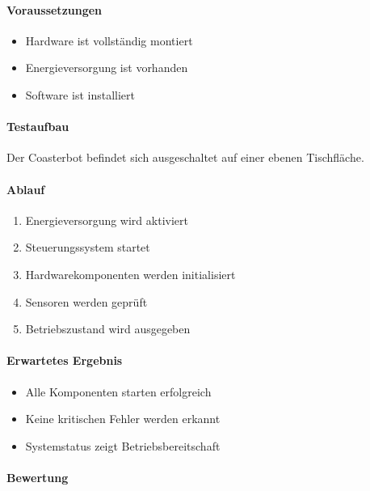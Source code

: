 \documentclass[
  a4paper,
  12pt,
  DIV=12,        %
  parskip=half,  %
  headings=small %
]{scrartcl}
\theoremstyle{definition}
\providecommand{\tightlist}{%
  \setlength{\itemsep}{0pt}\setlength{\parskip}{0pt}}
\theoremstyle{definition}
\begin{document}
\paragraph{Voraussetzungen}\label{voraussetzungen-23}

\begin{itemize}
\tightlist
\item
  Hardware ist vollständig montiert
\item
  Energieversorgung ist vorhanden
\item
  Software ist installiert
\end{itemize}

\paragraph{Testaufbau}\label{testaufbau}

Der Coasterbot befindet sich ausgeschaltet auf einer ebenen Tischfläche.

\paragraph{Ablauf}\label{ablauf-24}

\begin{enumerate}
\def\labelenumi{\arabic{enumi}.}
\tightlist
\item
  Energieversorgung wird aktiviert
\item
  Steuerungssystem startet
\item
  Hardwarekomponenten werden initialisiert
\item
  Sensoren werden geprüft
\item
  Betriebszustand wird ausgegeben
\end{enumerate}

\paragraph{Erwartetes Ergebnis}\label{erwartetes-ergebnis-24}

\begin{itemize}
\tightlist
\item
  Alle Komponenten starten erfolgreich
\item
  Keine kritischen Fehler werden erkannt
\item
  Systemstatus zeigt Betriebsbereitschaft
\end{itemize}

\paragraph{Bewertung}\label{bewertung-24}
\end{document}
